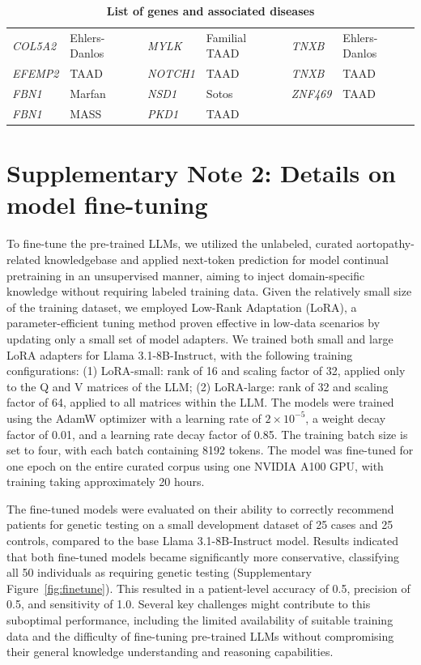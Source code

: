 \documentclass[fleqn,10pt]{wlscirep}
\begin{document}
\begin{table}[h]
\begin{tabular}{l l | l l | l l}
        \textit{COL5A2} & Ehlers-Danlos & \textit{MYLK} & Familial TAAD & \textit{TNXB} & Ehlers-Danlos \\
        \textit{EFEMP2} & TAAD & \textit{NOTCH1} & TAAD & \textit{TNXB} & TAAD \\
        \textit{FBN1} & Marfan & \textit{NSD1} & Sotos & \textit{ZNF469} & TAAD \\
        \textit{FBN1} & MASS & \textit{PKD1} & TAAD & & \\
        \bottomrule
    \end{tabular}
    \caption{\textbf{List of genes and associated diseases}}
    \label{tab:genes_diseases}
\end{table}

\section*{Supplementary Note 2: Details on model fine-tuning}
To fine-tune the pre-trained LLMs, we utilized the unlabeled, curated aortopathy-related knowledgebase and applied next-token prediction for model continual pretraining in an unsupervised manner, aiming to inject domain-specific knowledge without requiring labeled training data. Given the relatively small size of the training dataset, we employed Low-Rank Adaptation (LoRA), a parameter-efficient tuning method proven effective in low-data scenarios by updating only a small set of model adapters. We trained both small and large LoRA adapters for Llama 3.1-8B-Instruct, with the following training configurations: (1) LoRA-small: rank of 16 and scaling factor of 32, applied only to the Q and V matrices of the LLM; (2) LoRA-large: rank of 32 and scaling factor of 64, applied to all matrices within the LLM. The models were trained using the AdamW optimizer with a learning rate of $2\times10^{-5}$, a weight decay factor of 0.01, and a learning rate decay factor of 0.85. The training batch size is set to four, with each batch containing 8192 tokens. The model was fine-tuned for one epoch on the entire curated corpus using one NVIDIA A100 GPU, with training taking approximately 20 hours.

The fine-tuned models were evaluated on their ability to correctly recommend patients for genetic testing on a small development dataset of 25 cases and 25 controls, compared to the base Llama 3.1-8B-Instruct model. Results indicated that both fine-tuned models became significantly more conservative, classifying all 50 individuals as requiring genetic testing (Supplementary Figure~\ref{fig:finetune}). This resulted in a patient-level accuracy of 0.5, precision of 0.5, and sensitivity of 1.0. Several key challenges might contribute to this suboptimal performance, including the limited availability of suitable training data and the difficulty of fine-tuning pre-trained LLMs without compromising their general knowledge understanding and reasoning capabilities.
\end{document}
